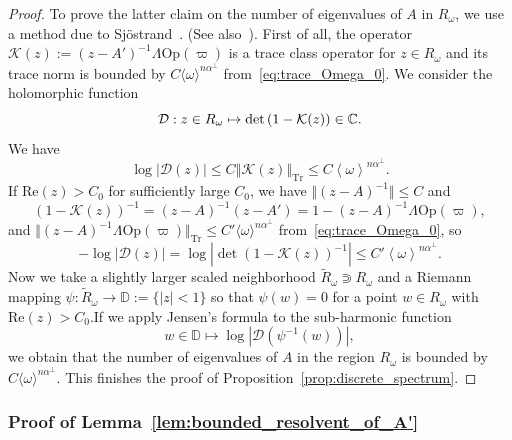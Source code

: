 \documentclass[AHL,Unicode,longabstracts,published]{cedram}
\newcommand{\clD}{\mathcal{D}}
\newcommand{\clK}{\mathcal{K}}
\newcommand{\Ree}{\mathrm{Re}}
\newcommand{\Opp}{\mathrm{Op}}
\newcommand{\Tr}{\mathrm{Tr}}
\newcommand{\bbC}{\mathbb{C}}
\newcommand{\bbD}{\mathbb{D}}
\newcommand{\Ree}{\mathrm{Re}}
\begin{document}
\begin{proof}
To prove the latter claim on the number of eigenvalues of $A$ in $R_{\omega}$, we use a method due to Sj\"ostrand~\cite[Section~4]{sjostrand_2000}. (See also~\cite[Section~8.2]{faure-tsujii_prequantum_maps_12}). First of all, the operator $\clK(z):=(z-A')^{-1}\Lambda\Opp (\varpi)$ is a trace class operator for $z\in R_{\omega}$ and its trace norm is bounded by $C\langle \omega\rangle ^{n\alpha^{\perp}}$ from~\eqref{eq:trace_Omega_0}. We consider the holomorphic function
\[
\text{\ensuremath{\clD}}:z\in R_{\omega}\mapsto\det\left(1-\clK(z)\right)\in\bbC.
\]
We have
\[
\log|\ensuremath{\clD}(z)|\le C\left\Vert \clK(z)\right\Vert _{\Tr}\le C\left\langle \omega\right\rangle ^{n\alpha^{\perp}}.
\]
If $\Ree(z)>C_{0}$ for sufficiently large $C_{0}$, we have $\Vert (z-A)^{-1}\Vert \le C$ and
\[
\left(1-\clK(z)\right)^{-1}=\left(z-A\right)^{-1}\left(z-A'\right)=1-\left(z-A\right)^{-1}\Lambda\Opp \left(\varpi\right),
\]
and $\Vert (z-A)^{-1}\Lambda\Opp (\varpi)\Vert _{\Tr}\le C'\langle \omega\rangle ^{n\alpha^{\perp}}$ from~\eqref{eq:trace_Omega_0}, so
\[
-\log\left|\ensuremath{\clD}\left(z\right)\right|=\log\left|\det \left(1-\clK(z)\right)^{-1}\right|\le C'\left\langle \omega\right\rangle ^{n\alpha^{\perp}}.
\]
Now we take a slightly larger scaled neighborhood $\widetilde{R}_{\omega}\Supset R_{\omega}$ and a Riemann mapping $\psi:\widetilde{R}_{\omega}\to\bbD:=\{|z|<1\}$ so that $\psi(w)=0$ for a point $w\in R_{\omega}$ with $\Ree(z)>C_{0}$.\linebreak If we apply Jensen's formula to the sub-harmonic function
\[
w\in\bbD\mapsto\log|\ensuremath{\clD}(\psi^{-1}(w))|,
\]
we obtain that the number of eigenvalues of $A$ in the region $R_{\omega}$ is bounded by $C\langle \omega\rangle^{n\alpha^{\perp}}$. This finishes the proof of Proposition~\ref{prop:discrete_spectrum}.
\end{proof}

\subsubsection{Proof of Lemma~\ref{lem:bounded_resolvent_of_A'}}\label{subsec:Proof-of-Lemma-1}
\end{document}
